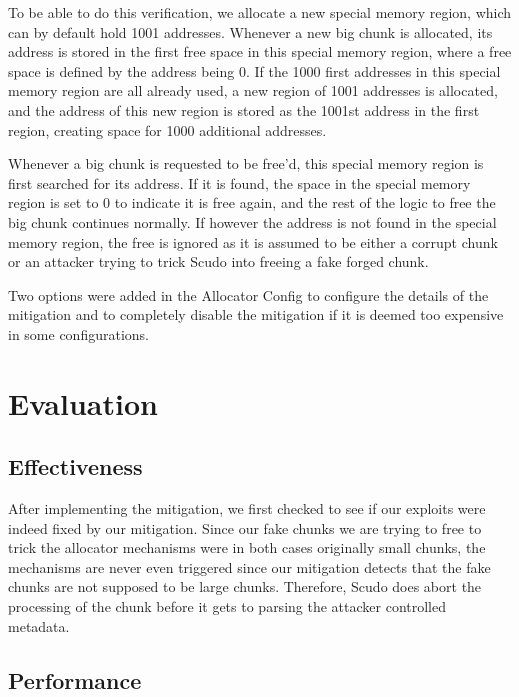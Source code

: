 \documentclass[a4paper,11pt,oneside]{report}
\begin{document}
To be able to do this verification, we allocate a new special memory region, which can by
default hold 1001 addresses. Whenever a new big chunk is allocated, its address is stored
in the first free space in this special memory region, where a free space is defined by
the address being 0. If the 1000 first addresses in this special memory region are all
already used, a new region of 1001 addresses is allocated, and the address of this new
region is stored as the 1001st address in the first region, creating space for 1000
additional addresses. 

Whenever a big chunk is requested to be free'd, this special memory region is first
searched for its address. If it is found, the space in the special memory region is set to
0 to indicate it is free again, and the rest of the logic to free the big chunk continues
normally. If however the address is not found in the special memory region, the free is
ignored as it is assumed to be either a corrupt chunk or an attacker trying to trick Scudo
into freeing a fake forged chunk.

Two options were added in the Allocator Config to configure the details of the mitigation
and to completely disable the mitigation if it is deemed too expensive in some
configurations.

\section{Evaluation}

\subsection{Effectiveness}

After implementing the mitigation, we first checked to see if our exploits were indeed
fixed by our mitigation. Since our fake chunks we are trying to free to trick the
allocator mechanisms were in both cases originally small chunks, the mechanisms are never
even triggered since our mitigation detects that the fake chunks are not supposed to be
large chunks. Therefore, Scudo does abort the processing of the chunk before it gets to
parsing the attacker controlled metadata.

\subsection{Performance}
\end{document}
